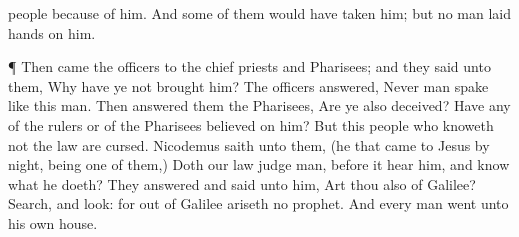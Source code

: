 {people
because of
him.
And
some
of
them would
have
taken
him;
but no
man
laid
hands
on
him.
\par }{\PP {}¶
Then
came the
officers
to the chief
priests
and
Pharisees;
and
they
said unto
them,
Why have
ye
not
brought
him?
The
officers
answered,
Never
man
spake
like
this
man.
Then
answered
them the
Pharisees,
Are
ye
also
deceived?
Have
any
of the
rulers
or
of the
Pharisees
believed
on
him?
But
this
people who
knoweth
not the
law
are
cursed.
Nicodemus
saith
unto
them, (he that
came
to
Jesus by
night,
being
one
of
them,)
Doth
our
law
judge
{}
man,
before it
hear
him,
and
know
what he
doeth?
They
answered
and
said unto
him,
Art
thou
also
of
Galilee?
Search,
and
look:
for out
of
Galilee
ariseth
no
prophet.
And every
man
went
unto his
own
house.

}
